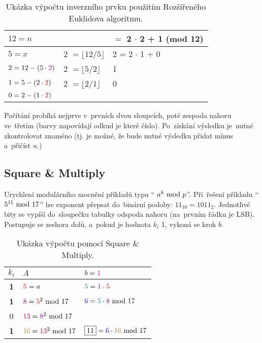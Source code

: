 \begin{table}[ht]
	\centering
\begin{tabular}{ll|l}
	$12 = n$                               & {}                                           & \boxed{\stackrel{?}{\pm} 5} $=$ {\color{violet}2} $\cdot$ {\color{blue}2} + {\color{brown}1} (mod 12) \\
	\hline
	$5 = x$                                & {\color{violet}2} $= \lfloor 12 / 5 \rfloor$ & {\color{blue}2} = {\color{red}2} $\cdot$ {\color{brown}1} + {\color{teal}0} \\
	$2 = 12 - (5 \cdot {\color{violet}2})$ & {\color{red}2}    $= \lfloor 5 / 2 \rfloor$  & {\color{brown}1} \\
	$1 = 5 - (2 \cdot {\color{red}2})$     & {\color{purple}2} $= \lfloor 2 / 1 \rfloor$  & {\color{teal}0} \\
	$0 = 2 - (1 \cdot {\color{purple}2})$  & {}                                           & {}
\end{tabular}
\caption*{Ukázka výpočtu inverzního prvku použitím Rozšířeného Euklidova algoritmu.}
\end{table}

\noindent
Počítání probíhá nejprve v~prvních dvou sloupcích, poté zespoda nahoru ve~třetím (barvy napovídají odkud je které číslo). Po~získání výsledku je~nutné zkontrolovat znaméno (tj. je možné, že bude nutné výsledku přidat mínus a~přičíst $n$.)

\subsection{Square \& Multiply}

Urychlení modulárního mocnění příkladů typu \enquote{ $a^k \ \mathrm{mod}\ p$}. Při~řešení příkladu \enquote{$5^{11} \ \mathrm{mod}\ 17$} lze exponent přepsat do~binární podoby: $11_{10} = 1011_2$. Jednotlivé bity se vypíší do~sloupečku tabulky odspoda nahoru (na~prvním řádku je LSB). Postupuje se zeshora dolů, a~pokud je hodnota $k_i$ 1, vykoná se krok $b$.

\begin{table}[ht]
\centering
\begin{tabular}{c|ll}
$k_i$      & $A$                                                & $b = {\color{magenta}1}$ \\
\hline
\textbf{1} & ${\color{red}5} = a$                               & ${\color{teal}5} = {\color{magenta}1} \cdot {\color{red}5}$ \\
\textbf{1} & ${\color{violet}8} = {\color{red}5}^2 \ \mathrm{mod}\ 17$     & ${\color{blue}6} = {\color{teal}5} \cdot {\color{violet}8} \ \mathrm{mod}\ 17$ \\
        0  & ${\color{purple}13} = {\color{violet}8}^2 \ \mathrm{mod}\ 17$ & \\
\textbf{1} & ${\color{brown}16} = {\color{purple}13}^2 \ \mathrm{mod}\ 17$ & $\boxed{11} = {\color{blue}6} \cdot {\color{brown}16} \ \mathrm{mod}\ 17$ \\
\end{tabular}
\caption*{Ukázka výpočtu pomocí Square \& Multiply.}
\end{table} 

